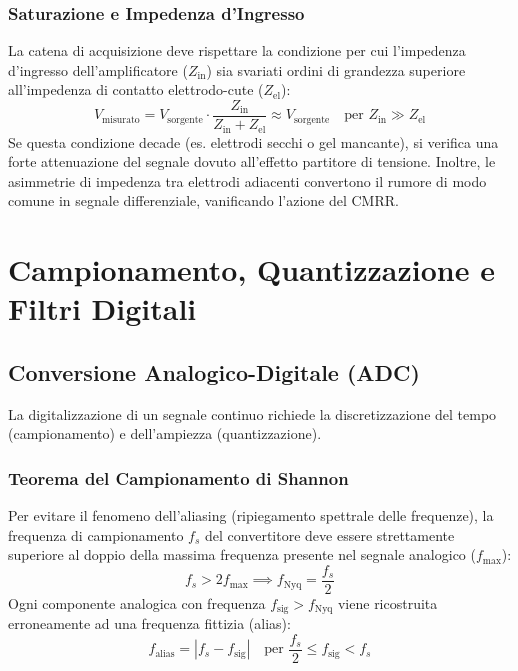 \documentclass[10pt, letterpaper]{report}
\begin{document}
\subsection{Saturazione e Impedenza d'Ingresso}
La catena di acquisizione deve rispettare la condizione per cui l'impedenza d'ingresso dell'amplificatore ($Z_{\text{in}}$) sia svariati ordini di grandezza superiore all'impedenza di contatto elettrodo-cute ($Z_{\text{el}}$):
\[
V_{\text{misurato}} = V_{\text{sorgente}} \cdot \frac{Z_{\text{in}}}{Z_{\text{in}} + Z_{\text{el}}} \approx V_{\text{sorgente}} \quad \text{per } Z_{\text{in}} \gg Z_{\text{el}}
\]
Se questa condizione decade (es. elettrodi secchi o gel mancante), si verifica una forte attenuazione del segnale dovuto all'effetto partitore di tensione. Inoltre, le asimmetrie di impedenza tra elettrodi adiacenti convertono il rumore di modo comune in segnale differenziale, vanificando l'azione del CMRR.

\chapter{Campionamento, Quantizzazione e Filtri Digitali}

\section{Conversione Analogico-Digitale (ADC)}
La digitalizzazione di un segnale continuo richiede la discretizzazione del tempo (campionamento) e dell'ampiezza (quantizzazione).

\subsection{Teorema del Campionamento di Shannon}
Per evitare il fenomeno dell'aliasing (ripiegamento spettrale delle frequenze), la frequenza di campionamento $f_s$ del convertitore deve essere strettamente superiore al doppio della massima frequenza presente nel segnale analogico ($f_{\max}$):
\[
f_s > 2 f_{\max} \implies f_{\text{Nyq}} = \frac{f_s}{2}
\]
Ogni componente analogica con frequenza $f_{\text{sig}} > f_{\text{Nyq}}$ viene ricostruita erroneamente ad una frequenza fittizia (alias):
\[
f_{\text{alias}} = |f_s - f_{\text{sig}}| \quad \text{per } \frac{f_s}{2} \le f_{\text{sig}} < f_s
\]
\end{document}
